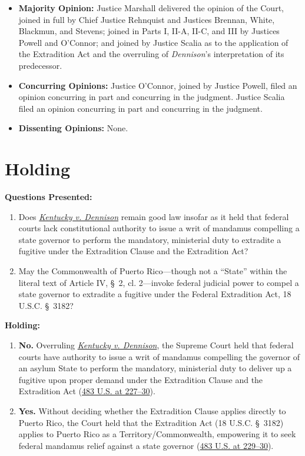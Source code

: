 \documentclass[12pt]{article}
\begin{document}
\begin{itemize}
    \item \textbf{Majority Opinion:} Justice Marshall delivered the opinion of the Court, joined in full by Chief Justice Rehnquist and Justices Brennan, White, Blackmun, and Stevens; joined in Parts I, II-A, II-C, and III by Justices Powell and O'Connor; and joined by Justice Scalia as to the application of the Extradition Act and the overruling of \textit{Dennison}'s interpretation of its predecessor.
    \item \textbf{Concurring Opinions:} Justice O'Connor, joined by Justice Powell, filed an opinion concurring in part and concurring in the judgment. Justice Scalia filed an opinion concurring in part and concurring in the judgment.
    \item \textbf{Dissenting Opinions:} None.
\end{itemize}

\section{Holding}
\textbf{Questions Presented:}

\begin{enumerate}
  \item Does \href{https://supreme.justia.com/cases/federal/us/65/66/}{\emph{Kentucky v. Dennison}} remain good law insofar as it held that federal courts lack constitutional authority to issue a writ of mandamus compelling a state governor to perform the mandatory, ministerial duty to extradite a fugitive under the Extradition Clause and the Extradition Act?
  \item May the Commonwealth of Puerto Rico---though not a ``State'' within the literal text of Article IV, \S~2, cl. 2---invoke federal judicial power to compel a state governor to extradite a fugitive under the Federal Extradition Act, 18 U.S.C. \S~3182?
\end{enumerate}

\textbf{Holding:}

\begin{enumerate}
  \item \textbf{No.} Overruling \href{https://supreme.justia.com/cases/federal/us/65/66/}{\emph{Kentucky v. Dennison}}, the Supreme Court held that federal courts have authority to issue a writ of mandamus compelling the governor of an asylum State to perform the mandatory, ministerial duty to deliver up a fugitive upon proper demand under the Extradition Clause and the Extradition Act (\href{https://supreme.justia.com/cases/federal/us/483/219/}{483 U.S. at 227--30}).
  \item \textbf{Yes.} Without deciding whether the Extradition Clause applies directly to Puerto Rico, the Court held that the Extradition Act (18 U.S.C. \S~3182) applies to Puerto Rico as a Territory/Commonwealth, empowering it to seek federal mandamus relief against a state governor (\href{https://supreme.justia.com/cases/federal/us/483/219/}{483 U.S. at 229--30}).
\end{enumerate}
\end{document}
